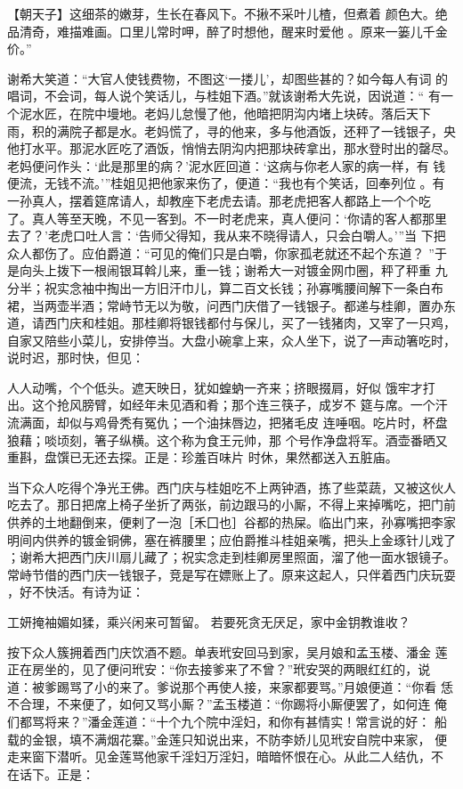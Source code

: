 【朝天子】这细茶的嫩芽，生长在春风下。不揪不采叶儿楂，但煮着
颜色大。绝品清奇，难描难画。口里儿常时呷，醉了时想他，醒来时爱他
。原来一篓儿千金价。”

谢希大笑道：“大官人使钱费物，不图这‘一搂儿’，却图些甚的？如今每人有词
的唱词，不会词，每人说个笑话儿，与桂姐下酒。”就该谢希大先说，因说道：“
有一个泥水匠，在院中墁地。老妈儿怠慢了他，他暗把阴沟内堵上块砖。落后天下
雨，积的满院子都是水。老妈慌了，寻的他来，多与他酒饭，还秤了一钱银子，央
他打水平。那泥水匠吃了酒饭，悄悄去阴沟内把那块砖拿出，那水登时出的罄尽。
老妈便问作头：‘此是那里的病？’泥水匠回道：‘这病与你老人家的病一样，有
钱便流，无钱不流。’”桂姐见把他家来伤了，便道：“我也有个笑话，回奉列位
。有一孙真人，摆着筵席请人，却教座下老虎去请。那老虎把客人都路上一个个吃
了。真人等至天晚，不见一客到。不一时老虎来，真人便问：‘你请的客人都那里
去了？’老虎口吐人言：‘告师父得知，我从来不晓得请人，只会白嚼人。’”当
下把众人都伤了。应伯爵道：“可见的俺们只是白嚼，你家孤老就还不起个东道？
”于是向头上拨下一根闹银耳斡儿来，重一钱；谢希大一对镀金网巾圈，秤了秤重
九分半；祝实念袖中掏出一方旧汗巾儿，算二百文长钱；孙寡嘴腰间解下一条白布
裙，当两壶半酒；常峙节无以为敬，问西门庆借了一钱银子。都递与桂卿，置办东
道，请西门庆和桂姐。那桂卿将银钱都付与保儿，买了一钱猪肉，又宰了一只鸡，
自家又陪些小菜儿，安排停当。大盘小碗拿上来，众人坐下，说了一声动箸吃时，
说时迟，那时快，但见：

人人动嘴，个个低头。遮天映日，犹如蝗蚋一齐来；挤眼掇肩，好似
饿牢才打出。这个抢风膀臂，如经年未见酒和肴；那个连三筷子，成岁不
筵与席。一个汗流满面，却似与鸡骨秃有冤仇；一个油抹唇边，把猪毛皮
连唾咽。吃片时，杯盘狼藉；啖顷刻，箸子纵横。这个称为食王元帅，那
个号作净盘将军。酒壶番晒又重斟，盘馔已无还去探。正是：珍羞百味片
时休，果然都送入五脏庙。

当下众人吃得个净光王佛。西门庆与桂姐吃不上两钟酒，拣了些菜蔬，又被这伙人
吃去了。那日把席上椅子坐折了两张，前边跟马的小厮，不得上来掉嘴吃，把门前
供养的土地翻倒来，便剌了一泡［禾囗也］谷都的热屎。临出门来，孙寡嘴把李家
明间内供养的镀金铜佛，塞在裤腰里；应伯爵推斗桂姐亲嘴，把头上金琢针儿戏了
；谢希大把西门庆川扇儿藏了；祝实念走到桂卿房里照面，溜了他一面水银镜子。
常峙节借的西门庆一钱银子，竞是写在嫖账上了。原来这起人，只伴着西门庆玩耍
，好不快活。有诗为证：

工妍掩袖媚如猱，乘兴闲来可暂留。
若要死贪无厌足，家中金钥教谁收？

按下众人簇拥着西门庆饮酒不题。单表玳安回马到家，吴月娘和孟玉楼、潘金
莲正在房坐的，见了便问玳安：“你去接爹来了不曾？”玳安哭的两眼红红的，说
道：被爹踢骂了小的来了。爹说那个再使人接，来家都要骂。”月娘便道：“你看
恁不合理，不来便了，如何又骂小厮？”孟玉楼道：“你踢将小厮便罢了，如何连
俺们都骂将来？”潘金莲道：“十个九个院中淫妇，和你有甚情实！常言说的好：
船载的金银，填不满烟花寨。”金莲只知说出来，不防李娇儿见玳安自院中来家，
便走来窗下潜听。见金莲骂他家千淫妇万淫妇，暗暗怀恨在心。从此二人结仇，不
在话下。正是：

